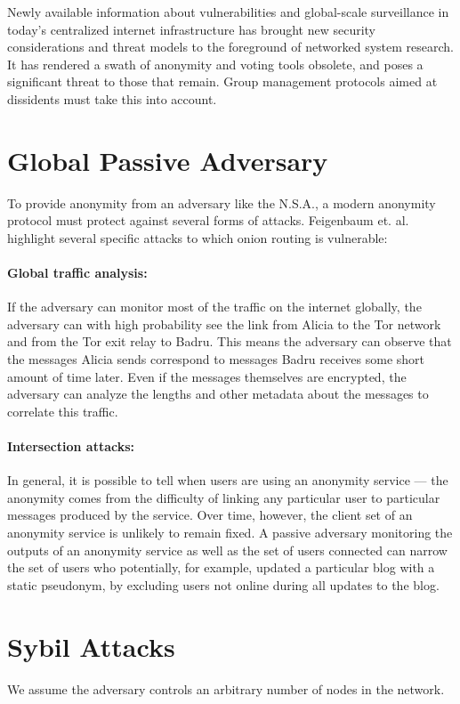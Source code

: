 Newly available information about vulnerabilities and global-scale
surveillance in today's centralized internet infrastructure has brought new
security considerations and threat models to the foreground of networked
system research. It has rendered a swath of anonymity and voting tools
obsolete, and poses a significant threat to those that remain. Group
management protocols aimed at dissidents must take this into account.

\section{Global Passive Adversary}
  To provide anonymity from an adversary like the N.S.A., a modern anonymity
  protocol must protect against several forms of attacks. Feigenbaum et.
  al.\cite{feigenbaum_seeking_2013} highlight several specific attacks to
  which onion routing is vulnerable:
  \paragraph{Global traffic analysis:}
  If the adversary can monitor most of the traffic on the internet globally,
  the adversary can with high probability see the link from Alicia to the Tor
  network and from the Tor exit relay to Badru. This means the adversary can
  observe that the messages Alicia sends correspond to messages Badru receives
  some short amount of time later. Even if the messages themselves are
  encrypted, the adversary can analyze the lengths and other metadata about
  the messages to correlate this traffic.
  \paragraph{Intersection attacks:}
  In general, it is possible to tell when users are using an anonymity service
  --- the anonymity comes from the difficulty of linking any particular user
  to particular messages produced by the service. Over time, however, the
  client set of an anonymity service is unlikely to remain fixed. A passive
  adversary monitoring the outputs of an anonymity service as well as the set
  of users connected can narrow the set of users who potentially, for example,
  updated a particular blog with a static pseudonym, by excluding users  not
  online during all updates to the blog.

\section{Sybil Attacks}
We assume the adversary controls an arbitrary number of nodes in the network.

